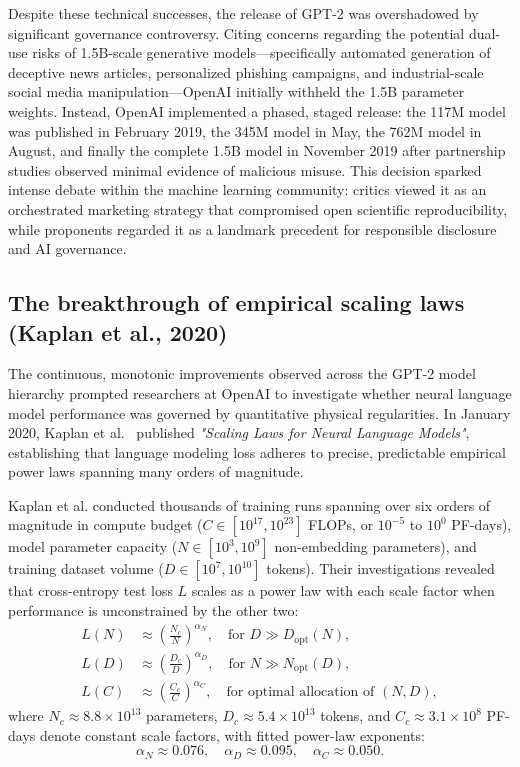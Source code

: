 \documentclass[../../../main.tex]{subfiles}
\begin{document}
Despite these technical successes, the release of GPT-2 was overshadowed by significant governance controversy. Citing concerns regarding the potential dual-use risks of 1.5B-scale generative models—specifically automated generation of deceptive news articles, personalized phishing campaigns, and industrial-scale social media manipulation—OpenAI initially withheld the 1.5B parameter weights. Instead, OpenAI implemented a phased, staged release: the 117M model was published in February 2019, the 345M model in May, the 762M model in August, and finally the complete 1.5B model in November 2019 after partnership studies observed minimal evidence of malicious misuse. This decision sparked intense debate within the machine learning community: critics viewed it as an orchestrated marketing strategy that compromised open scientific reproducibility, while proponents regarded it as a landmark precedent for responsible disclosure and AI governance.


\subsection{The breakthrough of empirical scaling laws (Kaplan et al., 2020)}
\label{subsec:kaplan_scaling_laws}

The continuous, monotonic improvements observed across the GPT-2 model hierarchy prompted researchers at OpenAI to investigate whether neural language model performance was governed by quantitative physical regularities. In January 2020, Kaplan et al.~\cite{kaplan2020} published \emph{"Scaling Laws for Neural Language Models"}, establishing that language modeling loss adheres to precise, predictable empirical power laws spanning many orders of magnitude.

Kaplan et al. conducted thousands of training runs spanning over six orders of magnitude in compute budget ($C \in [10^{17}, 10^{23}]$ FLOPs, or $10^{-5}$ to $10^0$ PF-days), model parameter capacity ($N \in [10^3, 10^9]$ non-embedding parameters), and training dataset volume ($D \in [10^7, 10^{10}]$ tokens). Their investigations revealed that cross-entropy test loss $L$ scales as a power law with each scale factor when performance is unconstrained by the other two:
\begin{align}
L(N) &\approx \left(\frac{N_c}{N}\right)^{\alpha_N}, \quad \text{for } D \gg D_{\text{opt}}(N), \label{eq:kaplan_N} \\
L(D) &\approx \left(\frac{D_c}{D}\right)^{\alpha_D}, \quad \text{for } N \gg N_{\text{opt}}(D), \label{eq:kaplan_D} \\
L(C) &\approx \left(\frac{C_c}{C}\right)^{\alpha_C}, \quad \text{for optimal allocation of } (N, D), \label{eq:kaplan_C}
\end{align}
where $N_c \approx 8.8 \times 10^{13}$ parameters, $D_c \approx 5.4 \times 10^{13}$ tokens, and $C_c \approx 3.1 \times 10^8$ PF-days denote constant scale factors, with fitted power-law exponents:
\begin{equation}
\alpha_N \approx 0.076, \quad \alpha_D \approx 0.095, \quad \alpha_C \approx 0.050.
\label{eq:kaplan_exponents}
\end{equation}
\end{document}
